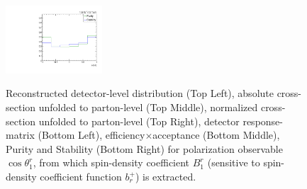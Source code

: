 \begin{figure}[htb]
\begin{center}
 \includegraphics[width=0.32\textwidth]{fig_fullRun2UL/unfolding/combined/PurStab_b1r.pdf} \\
\caption{Reconstructed detector-level distribution (Top Left), absolute cross-section unfolded to parton-level (Top Middle), normalized cross-section unfolded to parton-level (Top Right), detector response-matrix (Bottom Left), efficiency$\times$acceptance (Bottom Middle), Purity and Stability (Bottom Right) for polarization observable $\cos\theta_{1}^{r}$, from which spin-density coefficient $B_{1}^{r}$ (sensitive to spin-density coefficient function $b_r^{+}$) is extracted.}
\label{fig:b1r}
\end{center}
\end{figure}
\clearpage
